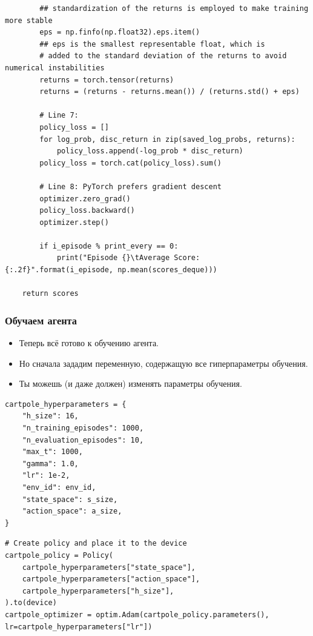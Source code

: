 \documentclass[11pt,a4paper]{article}
\begin{document}
\begin{lstlisting}
        ## standardization of the returns is employed to make training more stable
        eps = np.finfo(np.float32).eps.item()
        ## eps is the smallest representable float, which is
        # added to the standard deviation of the returns to avoid numerical instabilities
        returns = torch.tensor(returns)
        returns = (returns - returns.mean()) / (returns.std() + eps)

        # Line 7:
        policy_loss = []
        for log_prob, disc_return in zip(saved_log_probs, returns):
            policy_loss.append(-log_prob * disc_return)
        policy_loss = torch.cat(policy_loss).sum()

        # Line 8: PyTorch prefers gradient descent
        optimizer.zero_grad()
        policy_loss.backward()
        optimizer.step()

        if i_episode % print_every == 0:
            print("Episode {}\tAverage Score: {:.2f}".format(i_episode, np.mean(scores_deque)))

    return scores
\end{lstlisting}

\subsubsection{Обучаем агента}\label{train-it}

\begin{itemize}
\tightlist
\item
  Теперь всё готово к обучению агента.
\item
  Но сначала зададим переменную, содержащую все гиперпараметры обучения.
\item
  Ты можешь (и даже должен) изменять параметры обучения.
\end{itemize}

\begin{lstlisting}
cartpole_hyperparameters = {
    "h_size": 16,
    "n_training_episodes": 1000,
    "n_evaluation_episodes": 10,
    "max_t": 1000,
    "gamma": 1.0,
    "lr": 1e-2,
    "env_id": env_id,
    "state_space": s_size,
    "action_space": a_size,
}
\end{lstlisting}

\begin{lstlisting}
# Create policy and place it to the device
cartpole_policy = Policy(
    cartpole_hyperparameters["state_space"],
    cartpole_hyperparameters["action_space"],
    cartpole_hyperparameters["h_size"],
).to(device)
cartpole_optimizer = optim.Adam(cartpole_policy.parameters(), lr=cartpole_hyperparameters["lr"])
\end{lstlisting}
\end{document}
